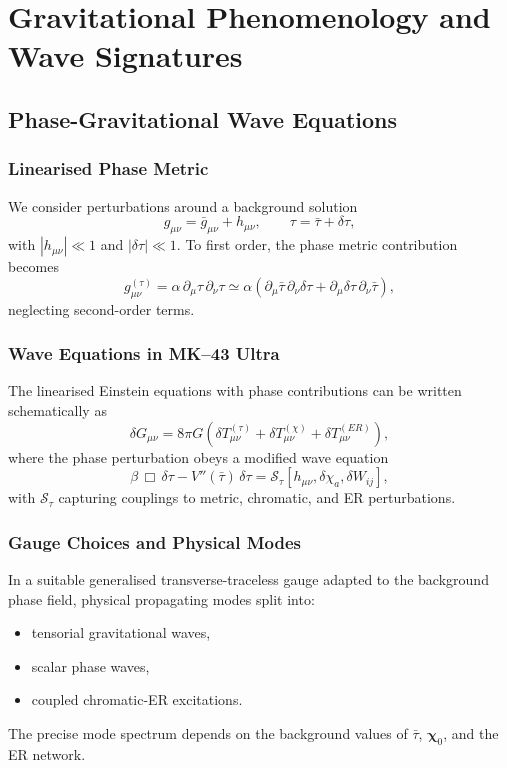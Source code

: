 

\part{Gravitational Phenomenology and Wave Signatures}

\chapter{Phase-Gravitational Wave Equations}

\section{Linearised Phase Metric}

We consider perturbations around a background solution
\[
g_{\mu\nu} = \bar{g}_{\mu\nu} + h_{\mu\nu},\qquad
\tau = \bar{\tau} + \delta\tau,
\]
with $|h_{\mu\nu}|\ll 1$ and $|\delta\tau|\ll 1$.
To first order, the phase metric contribution becomes
\[
g^{(\tau)}_{\mu\nu}
=
\alpha\, \partial_\mu \tau\, \partial_\nu\tau
\simeq
\alpha\left(
\partial_\mu \bar{\tau}\, \partial_\nu \delta\tau
+
\partial_\mu \delta\tau\, \partial_\nu \bar{\tau}
\right),
\]
neglecting second-order terms.

\section{Wave Equations in MK--43 Ultra}

The linearised Einstein equations with phase contributions can be written schematically as
\[
\delta G_{\mu\nu}
=
8\pi G\left(
\delta T_{\mu\nu}^{(\tau)}
+
\delta T_{\mu\nu}^{(\chi)}
+
\delta T_{\mu\nu}^{(ER)}
\right),
\]
where the phase perturbation obeys a modified wave equation
\[
\beta\, \Box\, \delta\tau
- V''(\bar{\tau})\, \delta\tau
=
\mathcal{S}_{\tau}[h_{\mu\nu},\delta\chi_a,\delta W_{ij}],
\]
with $\mathcal{S}_{\tau}$ capturing couplings to metric, chromatic, and ER perturbations.

\section{Gauge Choices and Physical Modes}

In a suitable generalised transverse-traceless gauge adapted to the background phase field, physical propagating modes split into:
\begin{itemize}
  \item tensorial gravitational waves,
  \item scalar phase waves,
  \item coupled chromatic-ER excitations.
\end{itemize}
The precise mode spectrum depends on the background values of $\bar{\tau}$, $\bm{\chi}_0$, and the ER network.

